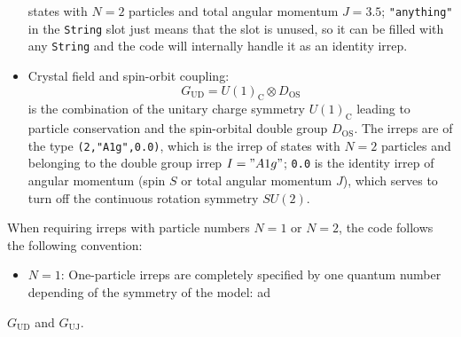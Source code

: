 \documentclass[notitlepage]{article}
\begin{document}
\begin{itemize}
        states with $N=2$ particles and total angular momentum
        $J=3.5$; \texttt{"anything"} in the \texttt{String} slot 
        just means that the slot is unused,
        so it can be filled with any \texttt{String} and the
        code will internally handle it as an identity irrep.
    \item Crystal field and spin-orbit coupling:
        \begin{equation}
            G_\text{UD} =
            U(1)_\text{C} \otimes
            D_\text{OS}
        \end{equation}
        is the combination of the unitary charge symmetry
        $U(1)_\text{C}$ leading to particle conservation and
        the spin-orbital double group $D_\text{OS}$. 
        The irreps are of the type \texttt{(2,"A1g",0.0)}, which 
        is the irrep of states with $N=2$ particles
        and belonging to the double group irrep $I="A1g"$;
        \texttt{0.0} is the identity irrep of angular
        momentum (spin $S$ or total angular momentum $J$),
        which serves to turn off the continuous rotation
        symmetry $SU(2)$.
\end{itemize}
When requiring irreps with particle numbers $N=1$ or $N=2$,
the code follows the following convention:
\begin{itemize}
    \item $N=1$: One-particle irreps are completely
        specified by one quantum number depending of the
        symmetry of the model:
        \subitem  ad
\end{itemize}

$G_\text{UD}$ and $G_\text{UJ}$.
\end{document}
